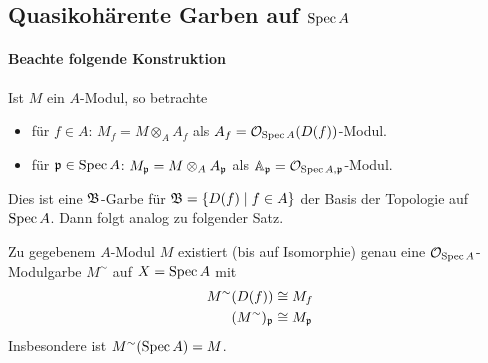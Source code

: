 \subsection{Quasikohärente Garben auf $\operatorname{Spec} A$}

\paragraph{Beachte folgende Konstruktion}
Ist $M$ ein $A$-Modul, so betrachte
\begin{itemize}
  \item für $f \in A$: $M_f = M \otimes_A A_f$ 
    als $A_f = \mathcal{O}_{\operatorname{Spec} A}(D(f))$-Modul.
  \item für $\mathfrak{p} \in \operatorname{Spec} A$: $M_\mathfrak{p} = M\otimes_A A_\mathfrak{p}$
    als $\mathbb{A}_\mathfrak{p} = \mathcal{O}_{\operatorname{Spec} A,\mathfrak{p}}$-Modul.
\end{itemize}
Dies ist eine $\mathfrak B$-Garbe für $\mathfrak B = \{D(f)\mid f\in A\}$ der Basis 
der Topologie auf $\operatorname{Spec} A$. Dann folgt analog zu 
 folgender Satz.

\begin{satz}
    \label{satz:a modul hat ein o spec a modulgarbe}
    Zu gegebenem $A$-Modul $M$ existiert (bis auf Isomorphie) genau eine
    $\mathcal{O}_{\operatorname{Spec} A}$-Modulgarbe $M^\sim$ auf $X = \operatorname{Spec} A$ mit
    \begin{align*}
        M^\sim (D(f)) &\cong M_f\\
        (M^\sim)_\mathfrak{p} &\cong M_\mathfrak{p}
    \end{align*} 
    Insbesondere ist $M^\sim(\operatorname{Spec} A) = M$.
\end{satz}

\pagebreak

